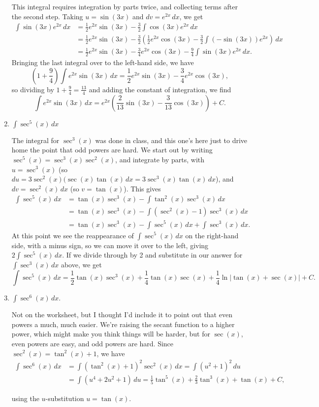 \documentclass[12pt]{article}
\newcommand{\di}{\displaystyle}
\newcommand{\abs}[1]{\lvert #1\rvert}
\begin{document}
\begin{enumerate}
 This integral requires integration by parts twice, and collecting terms after the second step. Taking $u=
\sin(3x)$ and $dv = e^{2x}\,dx$, we get
\begin{align*}
 \int \sin(3x)e^{2x}\,dx &= \frac{1}{2}e^{2x}\sin(3x)-\frac{3}{2}\int \cos(3x)e^{2x}\,dx\\
& = \frac{1}{2}e^{2x}\sin(3x)-\frac{3}{2}\left(\frac{1}{2}e^{2x}\cos(3x)-\frac{3}{2}\int (-\sin(3x))e^{2x}\right)\,dx\\
& = \frac{1}{2}e^{2x}\sin(3x)-\frac{3}{4}e^{2x}\cos(3x) - \frac{9}{4}\int \sin(3x)e^{2x}\,dx.
\end{align*}
Bringing the last integral over to the left-hand side, we have
\[
 \left(1+\frac{9}{4}\right)\int e^{2x}\sin(3x)\,dx = \frac{1}{2}e^{2x}\sin(3x)-\frac{3}{4}e^{2x}\cos(3x),
\]
so dividing by $1+\frac{9}{4} =\frac{13}{4}$ and adding the constant of integration, we find
\[
 \int e^{2x}\sin(3x)\,dx = e^{2x}\left(\frac{2}{13}\sin(3x)-\frac{3}{13}\cos(3x)\right)+C.
\]

\bigskip
 
 \item $\di \int \sec^5(x)\,dx$
 
 The integral for $\sec^3(x)$ was done in class, and this one's here just to drive home the point that odd powers are hard. We start out by writing $\sec^5(x) = \sec^3(x)\sec^2(x)$, and integrate by parts, with $u=\sec^3(x)$ (so $du = 3\sec^2(x)(\sec(x)\tan(x)\,dx = 3\sec^3(x)\tan(x)\,dx$), and $dv = \sec^2(x)\,dx$ (so $v=\tan(x)$). This gives
 \begin{align*}
 \int \sec^5(x)\,dx &= \tan(x)\sec^3(x) - \int \tan^2(x)\sec^3(x)\,dx\\
 & = \tan(x)\sec^3(x) - \int (\sec^2(x)-1)\sec^3(x)\,dx\\
 & = \tan(x)\sec^3(x) - \int \sec^5(x)\,dx +\int \sec^3(x)\,dx.
 \end{align*}
 At this point we see the reappearance of $\int\sec^5(x)\,dx$ on the right-hand side, with a minus sign, so we can move it over to the left, giving $2\int \sec^5(x)\,dx$. If we divide through by 2 and substitute in our answer for $\int \sec^3(x)\,dx$ above, we get
 \[
 \int \sec^5(x)\,dx = \frac{1}{2}\tan(x)\sec^3(x) + \frac{1}{4}\tan(x)\sec(x) +\frac{1}{4}\ln\abs{\tan(x)+\sec(x)}+C.
 \]
  

\item $\int \sec^6(x)\,dx$. 

Not on the worksheet, but I thought I'd include it to point out that even powers a much, much easier. We're raising the secant function to a higher power, which might make you think things will be harder, but for $\sec(x)$, even powers are easy, and odd powers are hard. Since $\sec^2(x) = \tan^2(x)+1$, we have
\begin{align*}
\int \sec^6(x)\,dx &= \int (\tan^2(x)+1)^2\sec^2(x)\,dx = \int (u^2+1)^2\,du \\
& = \int(u^4+2u^2+1)\,du= \frac{1}{5}\tan^5(x)+\frac{2}{3}\tan^3(x)+\tan(x)+C,
\end{align*}

using the $u$-substitution $u=\tan(x)$.

\end{enumerate}
  
\end{document}
